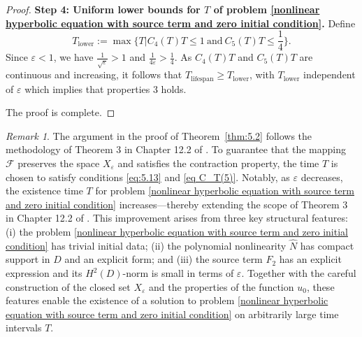 \documentclass[11pt,reqno,oneside]{amsart}
\numberwithin{equation}{section}
\theoremstyle{definition}
\theoremstyle{remark}
\newtheorem{remark}[theorem]{Remark}
\numberwithin{equation}{section}
\begin{document}
\begin{proof}
		
		\medskip
		\textbf{Step 4: Uniform lower bounds for \(T\) of problem \eqref{nonlinear hyperbolic equation with source term and zero initial condition}.}
		Define	
		\begin{equation}\label{5.17}
			T_{\mathrm{lower}}:=\max\{T|	C_4(T) T \leqslant 1\ \text{and}\ C_5(T) T \leqslant \frac{1}{4}\}.
		\end{equation}
		Since \(\varepsilon < 1\), we have \(\frac{1}{\sqrt{\varepsilon}}>1\) and \(\frac{1}{4 \varepsilon} > \frac{1}{4}\). As \(C_4(T)T\) and \(C_5(T)T\) are continuous and increasing, it follows that \( T_{\mathrm{lifespan}}\geqslant T_{\mathrm{lower}} \), with \(T_{\mathrm{lower}}\) independent of \(\varepsilon\) which implies that properties 3 holds.
		
		The proof is complete.
	\end{proof}
	
	
	\begin{remark}\label{remark 5.3}
		The argument in the proof of Theorem~\ref{thm:5.2} follows the methodology of Theorem 3 in Chapter 12.2 of \cite{Evans}. To guarantee that the mapping $\mathscr{F}$ preserves the space $X_{\varepsilon}$ and satisfies the contraction property, the time $T$ is chosen to satisfy conditions \eqref{eq:5.13} and \eqref{eq C_T(5)}. Notably, as $\varepsilon$ decreases, the existence time $T$ for problem \eqref{nonlinear hyperbolic equation with source term and zero initial condition} increases—thereby extending the scope of Theorem 3 in Chapter 12.2 of \cite{Evans}. This improvement arises from three key structural features: (i) the problem \eqref{nonlinear hyperbolic equation with source term and zero initial condition} has trivial initial data; (ii) the polynomial nonlinearity $\hat{N}$ has compact support in $D$ and an explicit form; and (iii) the source term $F_2$ has an explicit expression and its $H^2(D)$-norm is small in terms of $\varepsilon$. Together with the careful construction of the closed set $X_\varepsilon$ and the properties of the function $u_0$, these features enable the existence of a solution to problem \eqref{nonlinear hyperbolic equation with source term and zero initial condition} on arbitrarily large time intervals $T$.
	\end{remark}
	
\end{document}
